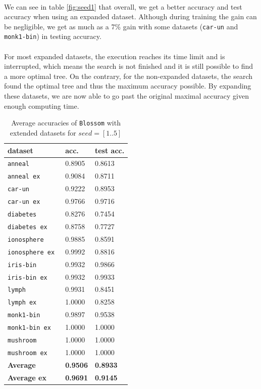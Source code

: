 \documentclass[12pt]{report}
\theoremstyle{definition}
\theoremstyle{definition}
\theoremstyle{definition}
\begin{document}
\paragraph{} We can see in table \ref{fig:seed1} that overall, we get a better accuracy and test accuracy when using
an expanded dataset. Although during training the gain can be negligible, we get as much as a 7\% gain with some datasets 
(\texttt{car-un} and \texttt{monk1-bin}) in testing accuracy.

\paragraph{} For most expanded datasets, the execution reaches its time limit and is interrupted, which means the search
is not finished and it is still possible to find a more optimal tree. On the contrary, for the non-expanded datasets,
the search found the optimal tree and thus the maximum accuracy possible. By expanding these datasets, we are now able to
go past the original maximal accuracy given enough computing time.

\begin{table}[ht]
    \centering
    \begin{tabular}{L{3.5cm} R{1.8cm} R{1.8cm}}
        \hline
        \bf dataset & \bf acc. & \bf test acc. \\
        \hline
        \tt anneal & 0.8905 & 0.8613 \\
        \tt anneal ex & 0.9084 & 0.8711 \\
        \tt car-un & 0.9222 & 0.8953 \\
        \tt car-un ex & 0.9766 & 0.9716 \\
        \tt diabetes & 0.8276 & 0.7454 \\
        \tt diabetes ex & 0.8758 & 0.7727 \\
        \tt ionosphere & 0.9885 & 0.8591 \\
        \tt ionosphere ex & 0.9992 & 0.8816 \\
        \tt iris-bin & 0.9932 & 0.9866 \\
        \tt iris-bin ex & 0.9932 & 0.9933 \\
        \tt lymph & 0.9931 & 0.8451 \\
        \tt lymph ex & 1.0000 & 0.8258 \\
        \tt monk1-bin & 0.9897 & 0.9538 \\
        \tt monk1-bin ex & 1.0000 & 1.0000 \\
        \tt mushroom & 1.0000 & 1.0000 \\
        \tt mushroom ex & 1.0000 & 1.0000 \\
        \hline
        \bf Average & \bf 0.9506 & \bf 0.8933 \\
        \hline
        \bf Average ex & \bf 0.9691 & \bf 0.9145 \\
        \hline
    \end{tabular}
    \caption{Average accuracies of \texttt{Blossom} with extended datasets for $seed=[1..5]$}
    \label{fig:avgacc}
\end{table}
\end{document}
